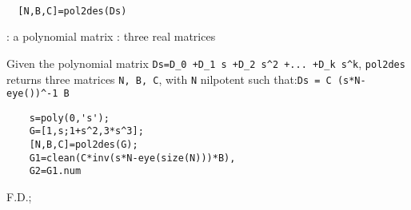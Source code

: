 \begin{mandesc}
   \\
\end{mandesc}
\begin{calling_sequence}
\begin{verbatim}
  [N,B,C]=pol2des(Ds)  
\end{verbatim}
\end{calling_sequence}
\begin{parameters}
  \begin{varlist}
    : a polynomial matrix
    : three real matrices
  \end{varlist}
\end{parameters}
\begin{mandescription}
  Given the polynomial matrix \verb!Ds=D_0 +D_1 s +D_2 s^2 +... +D_k s^k!,
  \verb!pol2des! returns three  matrices \verb!N, B, C!, with \verb!N! nilpotent 
  such that:\verb!Ds = C (s*N-eye())^-1 B!
\end{mandescription}
\begin{examples}
  \begin{Verbatim}
    s=poly(0,'s');
    G=[1,s;1+s^2,3*s^3];
    [N,B,C]=pol2des(G);
    G1=clean(C*inv(s*N-eye(size(N)))*B),
    G2=G1.num
  \end{Verbatim}
\end{examples}
\begin{manseealso}
     
\end{manseealso}
\begin{authors}
  F.D.;   
\end{authors}
